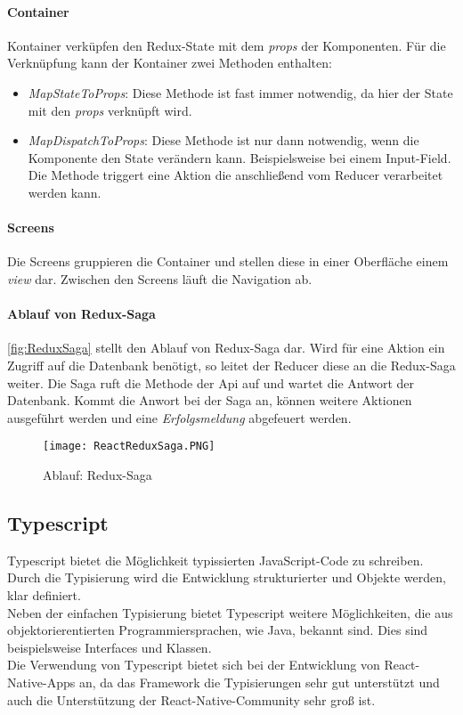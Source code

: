 \paragraph{Container}
Kontainer verküpfen den Redux-State mit dem \textit{props} der Komponenten. Für die Verknüpfung
kann der Kontainer zwei Methoden enthalten:
\begin{itemize}
    \item \textit{MapStateToProps}: Diese Methode ist fast immer notwendig, da hier der State mit den \textit{props} verknüpft wird.
    \item \textit{MapDispatchToProps}: Diese Methode ist nur dann notwendig, wenn die Komponente den State verändern kann. Beispielsweise bei einem Input-Field.
    Die Methode triggert eine Aktion die anschließend vom Reducer verarbeitet werden kann.
\end{itemize}

\paragraph{Screens}
Die Screens gruppieren die Container und stellen diese in einer Oberfläche einem \textit{view} dar.
Zwischen den Screens läuft die Navigation ab.

\paragraph{Ablauf von Redux-Saga}
\autoref{fig:ReduxSaga} stellt den Ablauf von Redux-Saga dar. Wird für eine Aktion ein Zugriff auf die Datenbank
benötigt, so leitet der Reducer diese an die Redux-Saga weiter. Die Saga ruft die Methode der Api auf und wartet 
die Antwort der Datenbank. Kommt die Anwort bei der Saga an, können weitere Aktionen ausgeführt werden und eine 
\textit{Erfolgsmeldung} abgefeuert werden.

\begin{figure}[h]
    \centering
    \texttt{[image: ReactReduxSaga.PNG]}
    \caption{Ablauf: Redux-Saga}
    \label{fig:ReduxSaga}
\end{figure}

\subsection{Typescript}
Typescript bietet die Möglichkeit typissierten JavaScript-Code zu schreiben.
Durch die Typisierung wird die Entwicklung strukturierter und Objekte werden,
klar definiert. \\
Neben der einfachen Typisierung bietet Typescript weitere Möglichkeiten, die aus
objektorierentierten Programmiersprachen, wie Java, bekannt sind. Dies sind beispielsweise
Interfaces und Klassen. \\
Die Verwendung von Typescript bietet sich bei der Entwicklung von React-Native-Apps an,
da das Framework die Typisierungen sehr gut unterstützt und auch die Unterstützung der React-Native-Community sehr groß ist. \cite{TypescriptReasons:online}

